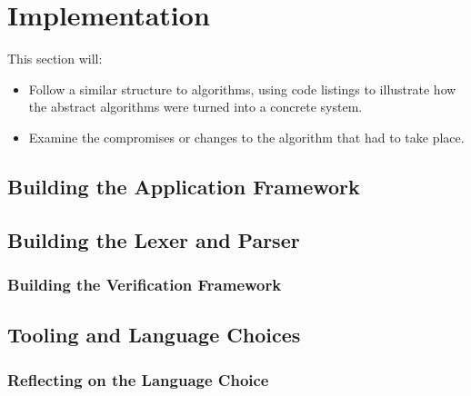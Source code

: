 
\chapter{Implementation} %
\label{cha:implementation}
This section will:
\begin{itemize}
    \item Follow a similar structure to algorithms, using code listings to illustrate how the abstract algorithms were turned into a concrete system. 
    \item Examine the compromises or changes to the algorithm that had to take place.
\end{itemize}

\section{Building the Application Framework} %
\label{sec:building_the_application_framework}


\section{Building the Lexer and Parser} %
\label{sec:building_the_lexer_and_parser}


\subsection{Building the Verification Framework} %
\label{sub:building_the_verification_framework}


\section{Tooling and Language Choices} %
\label{sec:tooling_and_language_choices}

\subsection{Reflecting on the Language Choice} %
\label{sub:reflecting_on_the_language_choice}




